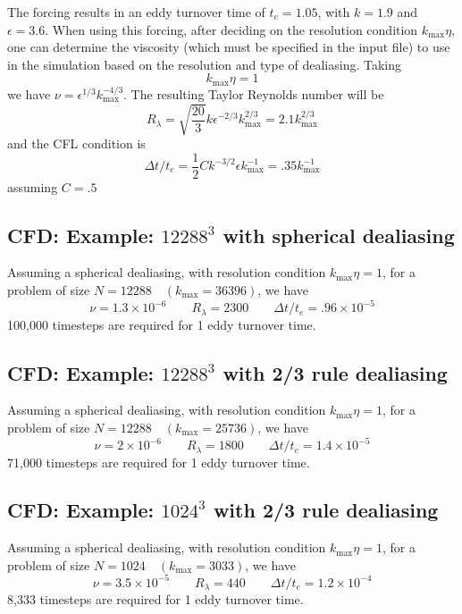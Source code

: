 \documentclass[12pt]{article}
\begin{document}
The forcing results in an eddy turnover time of $t_e = 1.05$,
with $k=1.9$ and $\epsilon=3.6$.  When using this forcing,
after deciding on the resolution condition $k_\text{max} \eta$,
one can determine the viscosity (which must be specified in the
input file) to use in the simulation based on the resolution and 
type of dealiasing.
Taking
\[
   k_\text{max} \eta = 1
\]
we have $ \nu = \epsilon^{1/3} k_\text{max}^{-4/3}$.
The resulting Taylor Reynolds number will be
\[
R_\lambda =   \sqrt{\frac{20}{3}} k \epsilon^{-2/3} k_\text{max}^{2/3}  =   2.1 k_\text{max}^{2/3}
\]
and the CFL condition is
\[
\Delta t / t_e =   \frac12 C k^{-3/2} \epsilon k_\text{max}^{-1} = .35 k_\text{max}^{-1}
\]
assuming $C=.5$


\subsection{CFD: Example: $12288^3$ with spherical dealiasing}
Assuming a spherical dealiasing, with resolution condition $k_\text{max} \eta=1$, 
for a problem of size $N=12288 \quad (k_\text{max} = 36396)$, we have
\[
\nu = 1.3 \times 10^{-6} \qquad  R_\lambda =  2300 \qquad \Delta t / t_e = .96\times10^{-5}
\]
100,000 timesteps are required for 1 eddy turnover time.  

\subsection{CFD: Example: $12288^3$ with 2/3 rule dealiasing}
Assuming a spherical dealiasing, with resolution condition $k_\text{max} \eta=1$, 
for a problem of size $N=12288 \quad (k_\text{max} = 25736)$, we have
\[
\nu = 2 \times 10^{-6} \qquad  R_\lambda =  1800\qquad \Delta t / t_e = 1.4\times10^{-5}
\]
71,000 timesteps are required for 1 eddy turnover time.  

\subsection{CFD: Example: $1024^3$ with 2/3 rule dealiasing}
Assuming a spherical dealiasing, with resolution condition $k_\text{max} \eta=1$, 
for a problem of size $N=1024 \quad (k_\text{max} = 3033)$, we have
\[
\nu = 3.5 \times 10^{-5} \qquad  R_\lambda =  440\qquad \Delta t / t_e = 1.2\times10^{-4}
\]
8,333 timesteps are required for 1 eddy turnover time.  
\end{document}
